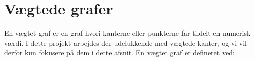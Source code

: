 \section{Vægtede grafer}
En vægtet graf er en graf hvori kanterne eller punkterne får tildelt en numerisk værdi. I dette projekt arbejdes der udelukkende med vægtede kanter, og vi vil derfor kun fokusere på dem i dette afsnit.
En vægtet graf er defineret ved:
